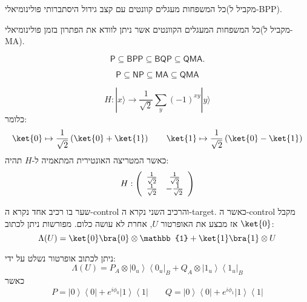\documentclass{tstextbook}
\begin{document}
\begin{definition}
כל המשפחות מעגלים קוונטים עם קצב גידול היסתברותי פולינומיאלי(מקביל ל-BPP).

\end{definition}
\begin{definition}
כל המשפחות המעגלים הקוונטים אשר ניתן לוודא את הפתרון בזמן פולינומיאלי(מקביל ל-MA).

\end{definition}
\begin{proposition}
$$\mathsf{P}\subseteq{\mathsf{BPP}}\subseteq{\mathsf{BQP}}\subseteq{\mathsf{QMA}}.$$

\end{proposition}
\begin{proposition}
$${\mathsf{P}}\subseteq{\mathsf{N P}}\subseteq{\mathsf{M A}}\subseteq{\mathsf{Q M A}}$$

\end{proposition}
\begin{definition}
$$H:|x\rangle\to\frac{1}{\sqrt{2}}\sum_{y}(-1)^{x y}|y\rangle$$
כלומר:
$$\ket{0} \mapsto \frac{1}{\sqrt{ 2 }}\left( \ket{0} +\ket{1}  \right)\qquad \ket{1} \mapsto \frac{1}{\sqrt{ 2 }}\left( \ket{0} -\ket{1}  \right)$$
כאשר המטריצה האונטירית המתאמיה ל-\(H\) תהיה:
$$H:\left(\begin{array}{c  c}{{\frac{1}{\sqrt{2}}}}&{{\frac{1}{\sqrt{2}}}}\\ {{\frac{1}{\sqrt{2}}}}&{{-\frac{1}{\sqrt{2}}}}\end{array}\right)$$

\end{definition}
\begin{definition}
שער בו רכיב אחד נקרא ה-control והרכיב השני נקרא ה-target. כאשר ה-control מקבל \(\ket{0}\) אז מבצע את האופרטור \(U\), אחרת לא עושה כלום. מפורשות ניתן לכתוב:
$$\Lambda (U)=\ket{0} \bra{0} \otimes \mathbb{1} +\ket{1} \bra{1} \otimes U $$

\end{definition}
\begin{proposition}
ניתן לכתוב אופרטור נשלט על ידי:
$$\Lambda\left(U\right)=P_{A}\otimes\left|0_{u}\right\rangle\left\langle0_{u}\right|_{B}+Q_{A}\otimes\left|1_{u}\right\rangle\left\langle1_{u}\right|_{B}$$
כאשר
$$P=\left|0\right\rangle\left\langle0\right|+e^{i\phi_{0}}\left|1\right\rangle\left\langle1\right|\qquad Q=\left|0\right\rangle\left\langle0\right|+e^{i\phi_{1}}\left|1\right\rangle\left\langle1\right|$$

\end{proposition}
\end{document}
